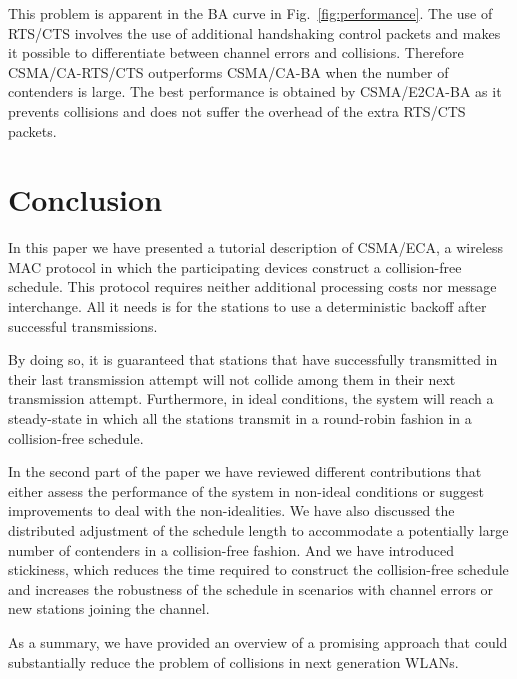 \documentclass[journal]{IEEEtran}
\begin{document}
This problem is apparent in the BA curve in Fig.~\ref{fig:performance}.
The use of RTS/CTS involves the use of additional handshaking control packets and makes it possible to differentiate between channel errors and collisions.
Therefore CSMA/CA-RTS/CTS outperforms CSMA/CA-BA when the number of contenders is large.
The best performance is obtained by CSMA/E2CA-BA as it prevents collisions and does not suffer the overhead of the extra RTS/CTS packets.


\section{Conclusion} \label{sec:conclusion}
In this paper we have presented a tutorial description of CSMA/ECA, a wireless MAC protocol in which the participating devices construct a collision-free schedule.
This protocol requires neither additional processing costs nor message interchange.
All it needs is for the stations to use a deterministic backoff after successful transmissions.

By doing so, it is guaranteed that stations that have successfully transmitted in their last transmission attempt will not collide among them in their next transmission attempt.
Furthermore, in ideal conditions, the system will reach a steady-state in which all the stations transmit in a round-robin fashion in a collision-free schedule.

In the second part of the paper we have reviewed different contributions that either assess the performance of the system in non-ideal conditions or suggest improvements to deal with the non-idealities.
We have also discussed the distributed adjustment of the schedule length to accommodate a potentially large number of contenders in a collision-free fashion.
And we have introduced stickiness, which reduces the time required to construct the collision-free schedule and increases the robustness of the schedule in scenarios with channel errors or new stations joining the channel.

As a summary, we have provided an overview of a promising approach that could substantially reduce the problem of collisions in next generation WLANs.
\end{document}
